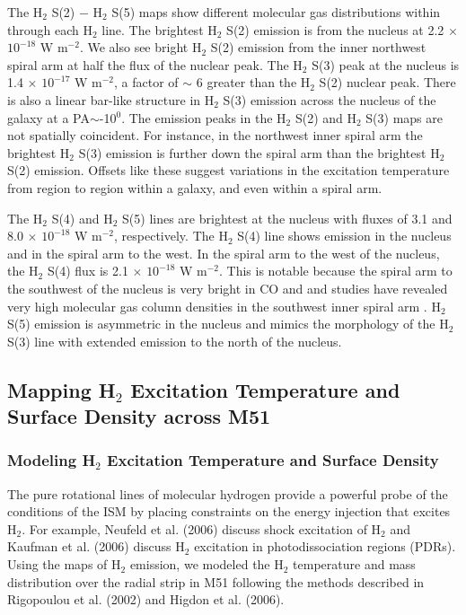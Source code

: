 \documentclass[manuscript]{aastex}
\begin{document}
The $\mathrm{ H_2}$ S(2) $-$ $\mathrm{H_2}$ S(5) maps show different
molecular gas distributions within  through each
$\mathrm{H_2}$ line.  The brightest $\mathrm{H_2}$ S(2) emission is
from the nucleus at 2.2 $\times$ $\mathrm{10^{-18}}$ W
$\mathrm{m^{-2}}$.  We also see bright $\mathrm{H_2}$ S(2) emission
from the inner northwest spiral arm at half the flux of the
nuclear peak.  The $\mathrm{H_2}$ S(3) peak at the nucleus is 1.4
$\times$ $\mathrm{10^{-17}}$ W $\mathrm{m^{-2}}$, a factor of $\sim$ 6
greater than the $\mathrm{H_2}$ S(2) nuclear peak.  There is also a
linear bar-like structure in $\mathrm{H_2}$ S(3) emission across the
nucleus of the galaxy at a PA$\sim$-10$^0$.  The emission peaks in the
$\mathrm{H_2}$ S(2) and $\mathrm{H_2}$ S(3) maps are not spatially
coincident.  For instance, in the northwest inner spiral arm the brightest
$\mathrm{H_2}$ S(3) emission is further down the spiral arm than 
the brightest $\mathrm{H_2}$ S(2) emission.  Offsets like
these suggest variations in the excitation temperature from 
region to region within a galaxy, and even within a spiral arm.

The $\mathrm{H_2}$ S(4) and $\mathrm{H_2}$ S(5) lines are brightest at
the nucleus with fluxes of 3.1 and 8.0 $\times$
$\mathrm{10^{-18}}$ W $\mathrm{m^{-2}}$, respectively.  The $\mathrm{H_2}$
S(4) line shows emission in the nucleus and in the spiral arm to the
west.  In the spiral arm to the west of the nucleus, the
$\mathrm{H_2}$ S(4) flux is 2.1 $\times$ $\mathrm{10^{-18}}$ W
$\mathrm{m^{-2}}$.  This is notable because the spiral arm to the
southwest of the nucleus is very bright in CO and and studies have
revealed very high molecular gas column densities in the southwest
inner spiral arm \citep{lor90, aal99}.  $\mathrm{H_2}$ S(5) emission is
asymmetric in the nucleus and mimics the morphology of the
$\mathrm{H_2}$ S(3) line with extended emission to the north of the
nucleus.

\subsection{Mapping H$_2$ Excitation Temperature and Surface Density across M51}

\subsubsection{Modeling H$_2$ Excitation Temperature and Surface Density}

The pure rotational lines of molecular hydrogen provide a powerful
probe of the conditions of the ISM by placing constraints on the
energy injection that excites $\mathrm{H_2}$.  For example, 
Neufeld et al. (2006) discuss shock excitation of H$_2$ and 
Kaufman et al. (2006) discuss H$_2$ excitation in photodissociation regions (PDRs).  
Using the maps of H$_2$ emission, we modeled the H$_2$ 
temperature and mass distribution over the radial strip in M51 
following the methods described in Rigopoulou et al. (2002) 
and Higdon et al. (2006).
\end{document}
